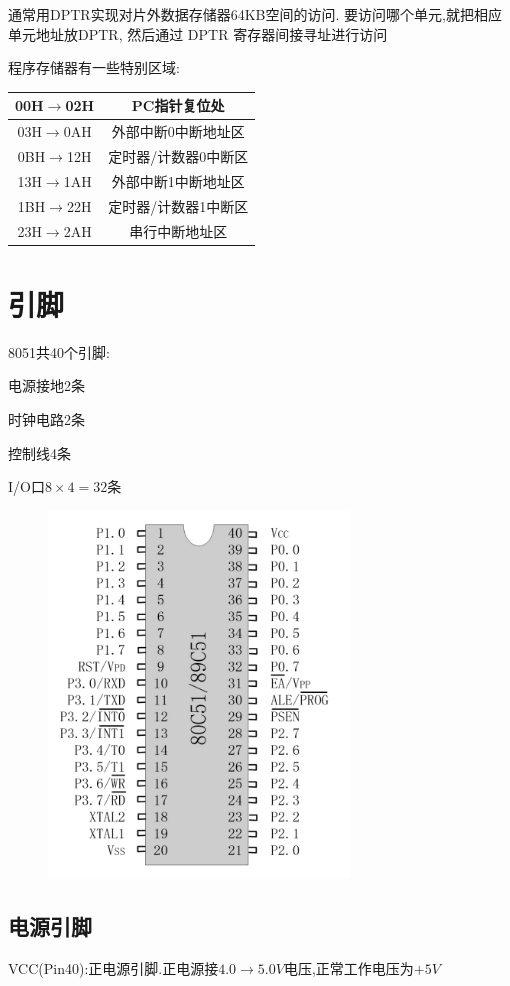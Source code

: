 \documentclass[12pt,a4paper,oneside]{ctexart}
\begin{document}
通常用DPTR实现对片外数据存储器64KB空间的访问.
要访问哪个单元,就把相应单元地址放DPTR,
然后通过 DPTR 寄存器间接寻址进行访问

程序存储器有一些特别区域:
\begin{table}[H]
    \centering
    \begin{tabular}{|c|c|}
    \hline
    00H$\to$02H & PC指针复位处     \\ \hline
    03H$\to$0AH & 外部中断0中断地址区  \\ \hline
    0BH$\to$12H & 定时器/计数器0中断区 \\ \hline
    13H$\to$1AH & 外部中断1中断地址区  \\ \hline
    1BH$\to$22H & 定时器/计数器1中断区 \\ \hline
    23H$\to$2AH & 串行中断地址区     \\ \hline
    \end{tabular}
\end{table}

\section{引脚}

8051共40个引脚:

电源接地2条

时钟电路2条

控制线4条

I/O口$8\times 4 = 32$条
\begin{figure}[H]
    \centering
    \includegraphics[width=8cm]{photos/8051引脚图.png}
\end{figure}
\subsection{电源引脚}
VCC(Pin40):正电源引脚.正电源接$4.0\to 5.0V$电压,正常工作电压为$+5V$
\end{document}
